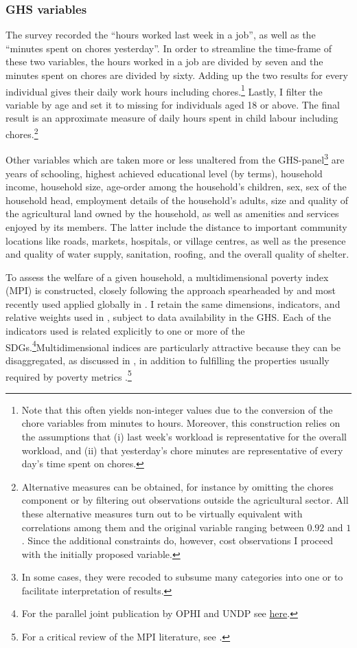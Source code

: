 \documentclass[a4paper,12pt]{article}
\theoremstyle{plain}
\theoremstyle{definition}
\theoremstyle{definition}
\theoremstyle{definition}
\theoremstyle{definition}
\begin{document}
\subsubsection{GHS variables}
\label{subsub:ghsvars}
The survey recorded the ``hours worked last week in a job'', as well as the ``minutes spent on chores yesterday''. In order to streamline the time-frame of these two variables, the hours worked in a job are divided by seven and the minutes spent on chores are divided by sixty. Adding up the two results for every individual gives their daily work hours including chores.\footnote{Note that this often yields non-integer values due to the conversion of the chore variables from minutes to hours. Moreover, this construction relies on the assumptions that (i) last week's workload is representative for the overall workload, and (ii) that yesterday's chore minutes are representative of every day's time spent on chores.} Lastly, I filter the variable by age and set it to missing for individuals aged 18 or above. The final result is an approximate measure of daily hours spent in child labour including chores.\footnote{Alternative measures can be obtained, for instance by omitting the chores component or by filtering out observations outside the agricultural sector. All these alternative measures turn out to be virtually equivalent with correlations among them and the original variable ranging between $0.92$ and $1$. Since the additional constraints do, however, cost observations I proceed with the initially proposed variable.}

Other variables which are taken more or less unaltered from the GHS-panel\footnote{In some cases, they were recoded to subsume many categories into one or to facilitate interpretation of results.} are years of schooling, highest achieved educational level (by terms), household income, household size, age-order among the household's children, sex, sex of the household head, employment details of the household's adults, size and quality of the agricultural land owned by the household, as well as amenities and services enjoyed by its members. The latter include the distance to important community locations like roads, markets, hospitals, or village centres, as well as the presence and quality of water supply, sanitation, roofing, and the overall quality of shelter.

To assess the welfare of a given household, a multidimensional poverty index (MPI) is constructed, closely following the approach spearheaded by \citet{alkire2011} and most recently used applied globally in \citet{alkire2020}. I retain the same dimensions, indicators, and relative weights used in \citet{alkire2018, alkire2020}, subject to data availability in the GHS. Each of the indicators used is related explicitly to one or more of the SDGs.\footnote{For the parallel joint publication by OPHI and UNDP see \href{http://hdr.undp.org/sites/default/files/2020_mpi_report_en.pdf}{here}. }Multidimensional indices are particularly attractive because they can be disaggregated, as discussed in \citet{bourguignon2003, foster1984}, in addition to fulfilling the properties usually required by poverty metrics \citep[see][]{Sen1976}.\footnote{For a critical review of the MPI literature, see \citet{ravallion2011}.}
\end{document}
